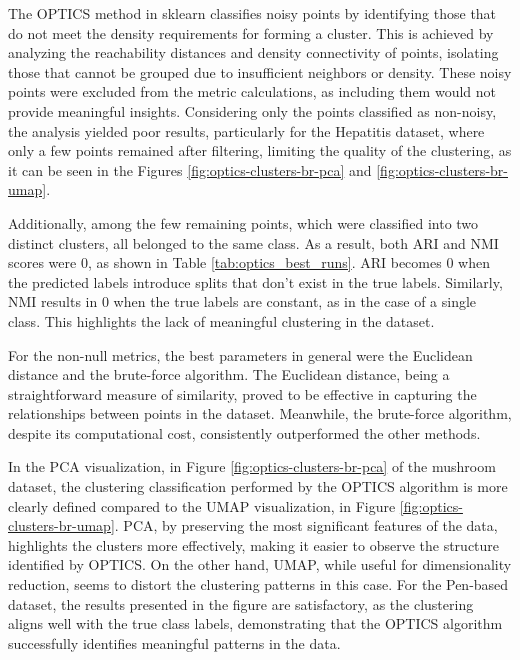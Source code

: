 The OPTICS method in sklearn classifies noisy points by identifying those that do not meet the density requirements for
 forming a cluster. This is achieved by analyzing the reachability distances and density connectivity of points, isolating
  those that cannot be grouped due to insufficient neighbors or density. These noisy points were excluded from the metric
   calculations, as including them would not provide meaningful insights. Considering only the points classified as non-noisy, 
   the analysis yielded poor results, particularly for the Hepatitis dataset, where only a few points remained after filtering, 
   limiting the quality of the clustering, as it can be seen in the Figures \ref{fig:optics-clusters-br-pca} and \ref{fig:optics-clusters-br-umap}.

   Additionally, among the few remaining points, which were classified into two distinct clusters, all belonged to the same 
   class. As a result, both ARI and NMI scores were 0, as shown in Table \ref{tab:optics_best_runs}.
    ARI becomes 0 when the predicted labels introduce splits that don't exist in the true labels. Similarly, NMI results in 0 
	when the true labels are constant, as in the case of a single class. This highlights the lack of meaningful clustering in the dataset.



For the non-null metrics, the best parameters in general were the Euclidean distance and the brute-force algorithm. 
	The Euclidean distance, being a straightforward measure of similarity, proved to be effective in capturing the relationships
	 between points in the dataset. Meanwhile, the brute-force algorithm, despite its computational cost, consistently 
	 outperformed the other methods.


In the PCA visualization, in Figure \ref{fig:optics-clusters-br-pca} of the mushroom dataset, the clustering classification performed by the OPTICS algorithm is
 more clearly defined compared to the UMAP visualization, in Figure \ref{fig:optics-clusters-br-umap}. PCA, by preserving the most significant features of the data, 
 highlights the clusters more effectively, making it easier to observe the structure identified by OPTICS. On the other hand,
  UMAP, while useful for dimensionality reduction, seems to distort the clustering patterns in this case. For the Pen-based 
  dataset, the results presented in the figure are satisfactory, as the clustering aligns well with the true class labels, 
  demonstrating that the OPTICS algorithm successfully identifies meaningful patterns in the data.


